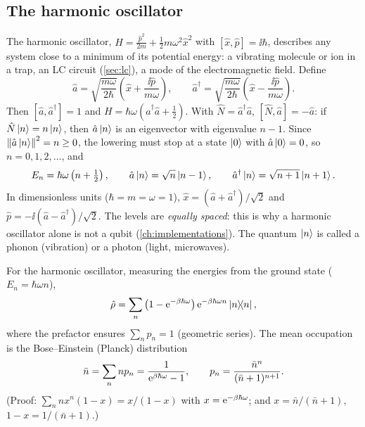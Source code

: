 \subsection{The harmonic oscillator}\label{sec:oscillator}
\begin{origin}
The harmonic oscillator, $H=\frac{\hat p^2}{2m}+\frac12m\omega^2\hat x^2$ with $[\hat x,\hat p]=\ii\hbar$, describes any system close to a minimum of its potential
energy: a vibrating molecule or ion in a trap, an LC circuit (\cref{sec:lc}), a mode of the electromagnetic field. Define
\begin{equation}
  \hat a=\sqrt{\frac{m\omega}{2\hbar}}\left(\hat x+\frac{\ii\hat p}{m\omega}\right),\qquad \hat a^\dagger=\sqrt{\frac{m\omega}{2\hbar}}\left(\hat x-\frac{\ii\hat p}{m\omega}\right).
\end{equation}
Then $[\hat a,\hat a^\dagger]=1$ and $H=\hbar\omega(\hat a^\dagger\hat a+\frac12)$. With $\hat N=\hat a^\dagger\hat a$, $[\hat N,\hat a]=-\hat a$: if $\hat N\left|n\right\rangle=n\left|n\right\rangle$, then
$\hat a\left|n\right\rangle$ is an eigenvector with eigenvalue $n-1$. Since $\left\|\hat a\left|n\right\rangle\right\|^2=n\ge0$, the lowering must stop at a state $\left|0\right\rangle$ with $\hat a\left|0\right\rangle=0$, so $n=0,1,2,\dots$, and
\begin{equation}
  E_n=\hbar\omega\left(n+\tfrac12\right),\qquad\hat a\left|n\right\rangle=\sqrt n\left|n-1\right\rangle,\qquad\hat a^\dagger\left|n\right\rangle=\sqrt{n+1}\left|n+1\right\rangle.
\end{equation}
In dimensionless units ($\hbar=m=\omega=1$), $\hat x=(\hat a+\hat a^\dagger)/\sqrt2$ and $\hat p=-\ii(\hat a-\hat a^\dagger)/\sqrt2$. The levels are \emph{equally spaced}: this is
why a harmonic oscillator alone is not a qubit (\cref{ch:implementations}). The quantum $\left|n\right\rangle$ is called a phonon (vibration) or a photon (light, microwaves).
\end{origin}
For the harmonic oscillator, measuring the energies from the ground state ($E_n=\hbar\omega n$),
\begin{equation}\label{eq:thermalHO}
  \hat\rho=\sum_n\left(1-\mathrm e^{-\beta\hbar\omega}\right)\mathrm e^{-\beta\hbar\omega n}\left|n\middle\rangle\!\middle\langle n\right|,
\end{equation}
where the prefactor ensures $\sum_np_n=1$ (geometric series). The mean occupation is the Bose--Einstein (Planck) distribution
\begin{equation}
  \bar n=\sum_nnp_n=\frac1{\mathrm e^{\beta\hbar\omega}-1},\qquad p_n=\frac{\bar n^n}{(\bar n+1)^{n+1}}.
\end{equation}
(Proof: $\sum_nnx^n(1-x)=x/(1-x)$ with $x=\mathrm e^{-\beta\hbar\omega}$; and $x=\bar n/(\bar n+1)$, $1-x=1/(\bar n+1)$.)

